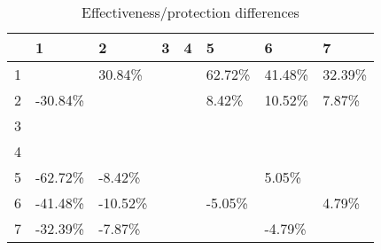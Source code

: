 \begin{table}[ht]
\centering
\begin{tabular}{rlllllll}
  \hline
 & 1 & 2 & 3 & 4 & 5 & 6 & 7 \\ 
  \hline
1 &  & 30.84\% &  &  & 62.72\% & 41.48\% & 32.39\% \\ 
  2 & -30.84\% &  &  &  & 8.42\% & 10.52\% & 7.87\% \\ 
  3 &  &  &  &  &  &  &  \\ 
  4 &  &  &  &  &  &  &  \\ 
  5 & -62.72\% & -8.42\% &  &  &  & 5.05\% &  \\ 
  6 & -41.48\% & -10.52\% &  &  & -5.05\% &  & 4.79\% \\ 
  7 & -32.39\% & -7.87\% &  &  &  & -4.79\% &  \\ 
   \hline
\end{tabular}
\caption{Effectiveness/protection differences} 
\end{table}
